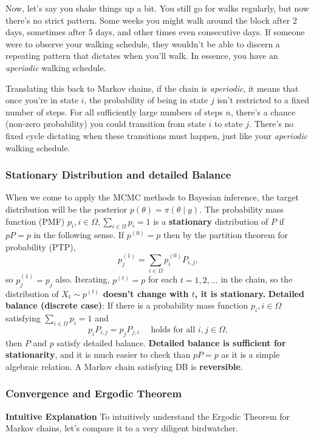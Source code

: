 \documentclass{article}
\begin{document}
Now, let's say you shake things up a bit. You still go for walks regularly, but now there's no strict pattern. Some weeks you might walk around the block after 2 days, sometimes after 5 days, and other times even consecutive days. If someone were to observe your walking schedule, they wouldn't be able to discern a repeating pattern that dictates when you'll walk. In essence, you have an \textit{aperiodic} walking schedule.

Translating this back to Markov chains, if the chain is \textit{aperiodic}, it means that once you're in state \( i \), the probability of being in state \( j \) isn't restricted to a fixed number of steps. For all sufficiently large numbers of steps \( n \), there's a chance (non-zero probability) you could transition from state \( i \) to state \( j \). There's no fixed cycle dictating when these transitions must happen, just like your \textit{aperiodic} walking schedule.

\subsubsection{Stationary Distribution and detailed Balance}
When we come to apply the MCMC methods to Bayesian inference, the target distribution will be the posterior $p(\theta)=\pi(\theta \mid y)$.
The probability mass function (PMF) $p_i, i \in \Omega, \sum_{i \in \Omega} p_i=1$ is a \textbf{stationary} distribution of $P$ if $p P=p$ in the following sense. If $p^{(0)}=p$ then by the partition theorem for probability (PTP),
$$
p_j^{(1)}=\sum_{i \in \Omega} p_i^{(0)} P_{i, j},
$$
so $p_j^{(1)}=p_j$ also. Iterating, $p^{(t)}=p$ for each $t=1,2, \ldots$ in the chain, so the distribution of \textbf{$X_t \sim p^{(t)}$ doesn't change with $t$, it is stationary.}
\newline
\textbf{Detailed balance (discrete case)}: If there is a probability mass function $p_i, i \in \Omega$ satisfying $\sum_{i \in \Omega} p_i=1$ and
$$
p_i P_{i, j}=p_j P_{j, i} \quad \text { holds for all } i, j \in \Omega,
$$
then $P$ and $p$ satisfy detailed balance.
\newline
\newline
\textbf{Detailed balance is sufficient for stationarity}, and it is much easier to check than $p P=p$ as it is a simple algebraic relation. A Markov chain satisfying DB is \textbf{reversible}.


\subsubsection{Convergence and Ergodic Theorem}
\textbf{Intuitive Explanation}
\newline
To intuitively understand the Ergodic Theorem for Markov chains, let's compare it to a very diligent birdwatcher.
\end{document}
